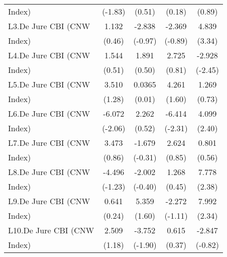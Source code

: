 {\begin{tabular}{l*{4}{c}}
Index)              &     (-1.83)         &      (0.51)         &      (0.18)         &      (0.89)         \\
[1em]
L3.De Jure CBI (CNW &       1.132         &      -2.838         &      -2.369         &       4.839\sym{***}\\
Index)              &      (0.46)         &     (-0.97)         &     (-0.89)         &      (3.34)         \\
[1em]
L4.De Jure CBI (CNW &       1.544         &       1.891         &       2.725         &      -2.928\sym{*}  \\
Index)              &      (0.51)         &      (0.50)         &      (0.81)         &     (-2.45)         \\
[1em]
L5.De Jure CBI (CNW &       3.510         &      0.0365         &       4.261         &       1.269         \\
Index)              &      (1.28)         &      (0.01)         &      (1.60)         &      (0.73)         \\
[1em]
L6.De Jure CBI (CNW &      -6.072\sym{*}  &       2.262         &      -6.414\sym{*}  &       4.099\sym{*}  \\
Index)              &     (-2.06)         &      (0.52)         &     (-2.31)         &      (2.40)         \\
[1em]
L7.De Jure CBI (CNW &       3.473         &      -1.679         &       2.624         &       0.801         \\
Index)              &      (0.86)         &     (-0.31)         &      (0.85)         &      (0.56)         \\
[1em]
L8.De Jure CBI (CNW &      -4.496         &      -2.002         &       1.268         &       7.778\sym{*}  \\
Index)              &     (-1.23)         &     (-0.40)         &      (0.45)         &      (2.38)         \\
[1em]
L9.De Jure CBI (CNW &       0.641         &       5.359         &      -2.272         &       7.992\sym{*}  \\
Index)              &      (0.24)         &      (1.60)         &     (-1.11)         &      (2.34)         \\
[1em]
L10.De Jure CBI (CNW&       2.509         &      -3.752         &       0.615         &      -2.847         \\
Index)              &      (1.18)         &     (-1.90)         &      (0.37)         &     (-0.82)         \\

\end{tabular}}
